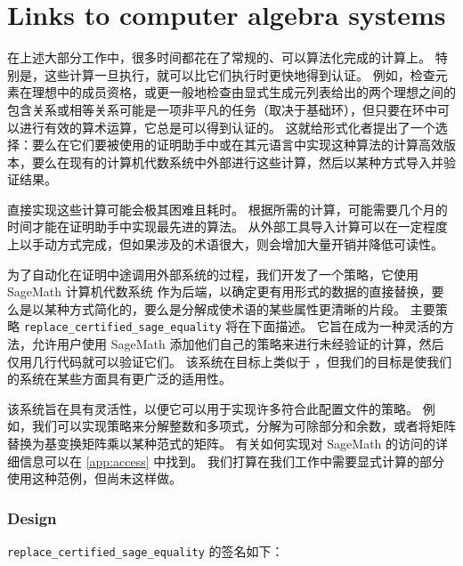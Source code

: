 \documentclass[sigplan,10pt,nonacm,
screen]{acmart} \settopmatter{printfolios=true,printccs=false,printacmref=false}
\begin{document}
\section{Links to computer algebra systems}\label{sec:Sageify}

在上述大部分工作中，很多时间都花在了常规的、可以算法化完成的计算上。
特别是，这些计算一旦执行，就可以比它们执行时更快地得到认证。
例如，检查元素在理想中的成员资格，或更一般地检查由显式生成元列表给出的两个理想之间的包含关系或相等关系可能是一项非平凡的任务（取决于基础环），但只要在环中可以进行有效的算术运算，它总是可以得到认证的。
这就给形式化者提出了一个选择：要么在它们要被使用的证明助手中或在其元语言中实现这种算法的计算高效版本，要么在现有的计算机代数系统中外部进行这些计算，然后以某种方式导入并验证结果。

直接实现这些计算可能会极其困难且耗时。
根据所需的计算，可能需要几个月的时间才能在证明助手中实现最先进的算法。
从外部工具导入计算可以在一定程度上以手动方式完成，但如果涉及的术语很大，则会增加大量开销并降低可读性。

为了自动化在证明中途调用外部系统的过程，我们开发了一个策略，它使用 SageMath 计算机代数系统 \cite{sagemath} 作为后端，以确定更有用形式的数据的直接替换，要么是以某种方式简化的，要么是分解成使术语的某些属性更清晰的片段。
主要策略 \lstinline{replace_certified_sage_equality} 将在下面描述。
它旨在成为一种灵活的方法，允许用户使用 SageMath 添加他们自己的策略来进行未经验证的计算，然后仅用几行代码就可以验证它们。
该系统在目标上类似于 \cite{lewis_extensible_2017, lewis_bi-directional_2022}，但我们的目标是使我们的系统在某些方面具有更广泛的适用性。

该系统旨在具有灵活性，以便它可以用于实现许多符合此配置文件的策略。
例如，我们可以实现策略来分解整数和多项式，分解为可除部分和余数，或者将矩阵替换为基变换矩阵乘以某种范式的矩阵。
有关如何实现对 SageMath 的访问的详细信息可以在 \cref{app:access} 中找到。
我们打算在我们工作中需要显式计算的部分使用这种范例，但尚未这样做。

\subsubsection*{Design}
\lstinline{replace_certified_sage_equality} 的签名如下：
\end{document}
